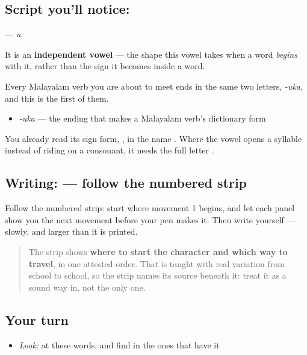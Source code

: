 \subsection*{Script you'll notice: }
\textbf{} — \emph{u}.

It is an \textbf{independent vowel} — the shape this vowel takes when a word \emph{begins} with it, rather than the sign it becomes inside a word.

Every Malayalam verb you are about to meet ends in the same two letters, \textbf{} \emph{-uka}, and this is the first of them.

\begin{itemize}
\raggedright
  \item \textbf{} \emph{-uka} — the ending that makes a Malayalam verb's dictionary form
\end{itemize}

You already read its sign form, \textbf{}, in the name \textbf{}. Where the vowel opens a syllable instead of riding on a consonant, it needs the full letter \textbf{}.

\subsection*{Writing:  — follow the numbered strip}

Follow the numbered strip: start where movement 1 begins, and let each panel show you the next movement before your pen makes it. Then write  yourself — slowly, and larger than it is printed.

\begin{quote}
The strip shows \textbf{where to start the character and which way to travel}, in one attested order. That is taught with real variation from school to school, so the strip names its source beneath it: treat it as a sound way in, not the only one.
\end{quote}

\subsection*{Your turn}
\begin{itemize}
\raggedright
  \item \emph{Look:} at these words, and find  in the ones that have it
\end{itemize}

